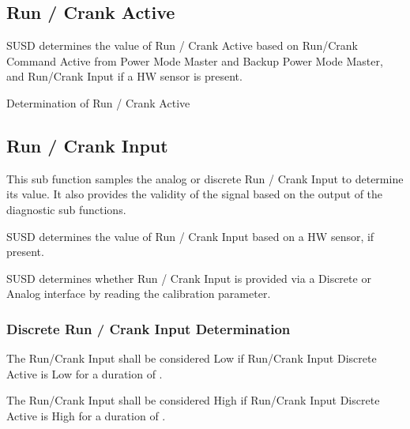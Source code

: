 \subsection{Run / Crank Active}
\label{sec:run_crank_active}

{SUSD determines the value of Run / Crank Active based on Run/Crank Command Active from Power Mode Master and Backup Power Mode Master, and Run/Crank Input if a HW sensor is present.}
{  }

{Determination of Run / Crank Active
}
{        }

\subsection{Run / Crank Input}
\label{sec:run_crank_input}
This sub function samples the analog or discrete Run / Crank Input to determine its value.
It also provides the validity of the signal based on the output of the diagnostic sub functions.

{SUSD determines the value of Run / Crank Input based on a HW sensor, if present.}
{    }

{SUSD determines whether Run / Crank Input is provided via a Discrete or Analog interface by reading the  calibration parameter.}
{     }

\subsubsection{Discrete Run / Crank Input Determination}
{The Run/Crank Input shall be considered Low if Run/Crank Input Discrete Active is Low for a duration of .

The Run/Crank Input shall be considered High if Run/Crank Input Discrete Active is High for a duration of .
}
{  }

